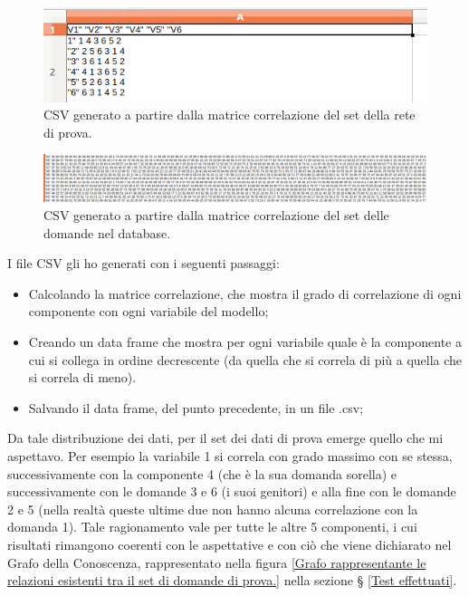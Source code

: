 \begin{figure}[H]
\centering
	\includegraphics[width=0.60\linewidth]{../../PCA/plot/CSV_rete-prova.png}
	\caption{CSV generato a partire dalla matrice correlazione del set della rete di prova.}
	\label{CSV generato a partire dalla matrice correlazione del set della rete di prova.}
\end{figure}
\begin{figure}[H]
\centering
	\includegraphics[width=1\linewidth]{../../PCA/plot/CSV_rete-db.png}
	\caption{CSV generato a partire dalla matrice correlazione del set delle domande nel database.}
	\label{CSV generato a partire dalla matrice correlazione del set delle domande nel database.}
\end{figure}
\noindent
I file CSV gli ho generati con i seguenti passaggi:
\begin{itemize}
\item Calcolando la matrice correlazione, che mostra il grado di correlazione di ogni componente con ogni variabile del modello;
\item Creando un data frame che mostra per ogni variabile quale \`e la componente a cui si collega in ordine decrescente (da  quella che si correla di pi\`u a quella che si correla di meno).
\item Salvando il data frame, del punto precedente, in un file .csv;
\end{itemize}
\noindent
Da tale distribuzione dei dati, per il set dei dati di prova emerge quello che mi aspettavo. Per esempio la variabile 1 si correla con grado massimo con se stessa, successivamente con la componente 4 (che \`e la sua domanda sorella) e successivamente con le domande 3 e 6 (i suoi genitori) e alla fine con le domande 2 e 5 (nella realt\`a queste ultime due non hanno alcuna correlazione con la domanda 1). Tale ragionamento vale per tutte le altre  5 componenti, i cui risultati rimangono coerenti con le aspettative e con ci\`o che viene dichiarato nel Grafo della Conoscenza, rappresentato nella figura \ref{Grafo rappresentante le relazioni esistenti tra il set di domande di prova.} nella sezione § \ref{Test effettuati}.\\\\
